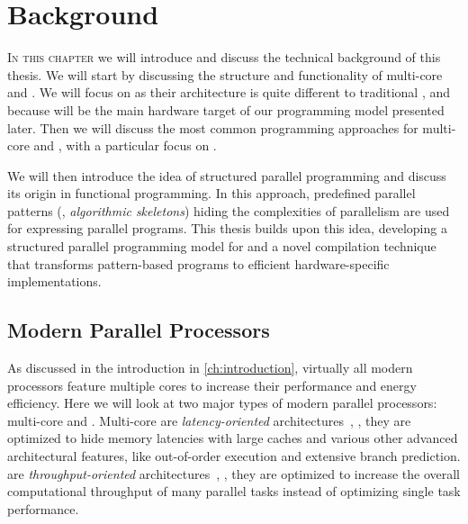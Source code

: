 
\chapter{Background} %
%

\label{chapter:background}
\label{chapter:state-of-the-art}

\lettrine[lines=3, loversize=0.1]{I}{n this chapter} we will introduce and discuss the technical background of this thesis.
We will start by discussing the structure and functionality of multi-core \CPUs and \GPUs.
We will focus on \GPUs as their architecture is quite different to traditional \CPUs, and because \GPUs will be the main hardware target of our \SkelCL programming model presented later.
Then we will discuss the most common programming approaches for multi-core \CPUs and \GPUs, with a particular focus on \OpenCL.

We will then introduce the idea of structured parallel programming and discuss its origin in functional programming.
In this approach, predefined parallel patterns (\aka, \emph{algorithmic skeletons}) hiding the complexities of parallelism are used for expressing parallel programs.
This thesis builds upon this idea, developing a structured parallel programming model for \GPUs and a novel compilation technique that transforms pattern-based programs to efficient hardware-specific implementations.

\section{Modern Parallel Processors}
As discussed in the introduction in \autoref{ch:introduction}, virtually all modern processors feature multiple cores to increase their performance and energy efficiency.
Here we will look at two major types of modern parallel processors: multi-core \CPUs and \GPUs.
Multi-core \CPUs are \emph{latency-oriented} architectures~\cite{GarlandK10}, \ie, they are optimized to hide memory latencies with large caches and various other advanced architectural features, like out-of-order execution and extensive branch prediction.
\GPUs are \emph{throughput-oriented} architectures~\cite{GarlandK10}, \ie, they are optimized to increase the overall computational throughput of many parallel tasks instead of optimizing single task performance.

